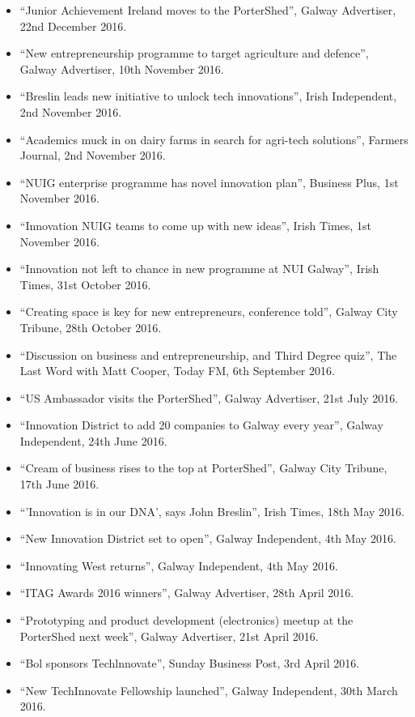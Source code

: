 \documentclass[10pt,a4paper]{res} %
\begin{document}
\begin{resume}
{\begin{itemize}
\item ``Junior Achievement Ireland moves to the PorterShed'', Galway Advertiser, 22nd December 2016.
\item ``New entrepreneurship programme to target agriculture and defence'', Galway Advertiser, 10th November 2016.
\item ``Breslin leads new initiative to unlock tech innovations'', Irish Independent, 2nd November 2016.
\item ``Academics muck in on dairy farms in search for agri-tech solutions'', Farmers Journal, 2nd November 2016.
\item ``NUIG enterprise programme has novel innovation plan'', Business Plus, 1st November 2016.
\item ``Innovation NUIG teams to come up with new ideas'', Irish Times, 1st November 2016.
\item ``Innovation not left to chance in new programme at NUI Galway'', Irish Times, 31st October 2016.
\item ``Creating space is key for new entrepreneurs, conference told'', Galway City Tribune, 28th October 2016.
\item ``Discussion on business and entrepreneurship, and Third Degree quiz'', The Last Word with Matt Cooper, Today FM, 6th September 2016.
\item ``US Ambassador visits the PorterShed'', Galway Advertiser, 21st July 2016.
\item ``Innovation District to add 20 companies to Galway every year'', Galway Independent, 24th June 2016.
\item ``Cream of business rises to the top at PorterShed'', Galway City Tribune, 17th June 2016.
\item ``'Innovation is in our DNA', says John Breslin'', Irish Times, 18th May 2016.
\item ``New Innovation District set to open'', Galway Independent, 4th May 2016.
\item ``Innovating West returns'', Galway Independent, 4th May 2016.
\item ``ITAG Awards 2016 winners'', Galway Advertiser, 28th April 2016.
\item ``Prototyping and product development (electronics) meetup at the PorterShed next week'', Galway Advertiser, 21st April 2016.
\item ``Bol sponsors Techlnnovate'', Sunday Business Post, 3rd April 2016.
\item ``New TechInnovate Fellowship launched'', Galway Independent, 30th March 2016.

\end{itemize}}
\end{resume}
\end{document}
